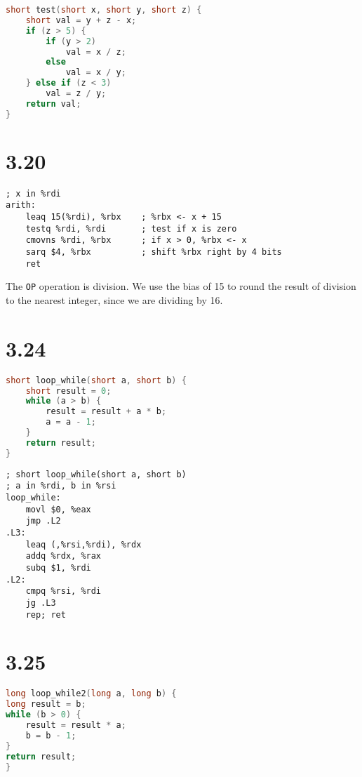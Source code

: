 \documentclass{article}
\begin{document}
\begin{lstlisting}[language=C]
short test(short x, short y, short z) {
    short val = y + z - x;
    if (z > 5) {
        if (y > 2)
            val = x / z;
        else
            val = x / y;
    } else if (z < 3)
        val = z / y;
    return val;
}
\end{lstlisting}

\section*{3.20}

\begin{lstlisting}[language=myassembly]
; x in %rdi
arith:
    leaq 15(%rdi), %rbx    ; %rbx <- x + 15
    testq %rdi, %rdi       ; test if x is zero
    cmovns %rdi, %rbx      ; if x > 0, %rbx <- x
    sarq $4, %rbx          ; shift %rbx right by 4 bits
    ret
\end{lstlisting}

\noindent The \texttt{OP} operation is division. We use the bias of 15 to round the result of division to the nearest integer, since we are dividing by 16.

\section*{3.24}

\begin{lstlisting}[language=C]
short loop_while(short a, short b) {
    short result = 0;
    while (a > b) {
        result = result + a * b;
        a = a - 1;
    }
    return result;
}
\end{lstlisting}

\begin{lstlisting}[language=myassembly]
; short loop_while(short a, short b)
; a in %rdi, b in %rsi
loop_while:
    movl $0, %eax
    jmp .L2
.L3:
    leaq (,%rsi,%rdi), %rdx
    addq %rdx, %rax
    subq $1, %rdi
.L2:
    cmpq %rsi, %rdi
    jg .L3
    rep; ret
\end{lstlisting}

\newpage
\section*{3.25}

\begin{lstlisting}[language=C]
long loop_while2(long a, long b) {
long result = b;
while (b > 0) {
    result = result * a;
    b = b - 1;
}
return result;
}
\end{lstlisting}
\end{document}
